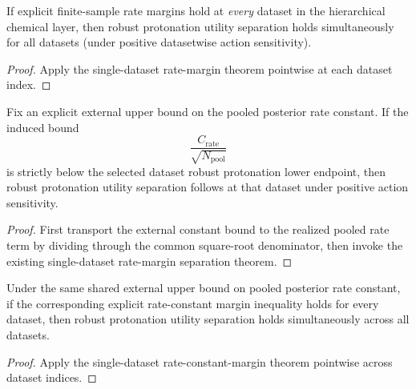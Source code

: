 \begin{theorem}\label{thm:hierarchical-chemical-realdata-separation-rate-margin-all-datasets}
If explicit finite-sample rate margins hold at \emph{every} dataset in the hierarchical chemical layer, then robust protonation utility separation holds simultaneously for all datasets (under positive datasetwise action sensitivity).
\end{theorem}

\begin{proof}
Apply the single-dataset rate-margin theorem pointwise at each dataset index.
\end{proof}

\begin{theorem}\label{thm:hierarchical-chemical-realdata-separation-rate-constant-margin}
Fix an explicit external upper bound on the pooled posterior rate constant. If the induced bound
\[
\frac{C_{\mathrm{rate}}}{\sqrt{N_{\mathrm{pool}}}}
\]
is strictly below the selected dataset robust protonation lower endpoint, then robust protonation utility separation follows at that dataset under positive action sensitivity.
\end{theorem}

\begin{proof}
First transport the external constant bound to the realized pooled rate term by dividing through the common square-root denominator, then invoke the existing single-dataset rate-margin separation theorem.
\end{proof}

\begin{theorem}\label{thm:hierarchical-chemical-realdata-separation-rate-constant-margin-all-datasets}
Under the same shared external upper bound on pooled posterior rate constant, if the corresponding explicit rate-constant margin inequality holds for every dataset, then robust protonation utility separation holds simultaneously across all datasets.
\end{theorem}

\begin{proof}
Apply the single-dataset rate-constant-margin theorem pointwise across dataset indices.
\end{proof}

